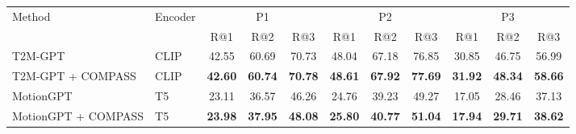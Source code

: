 \begin{tabular*}{\textwidth}{@{\extracolsep{\fill}}ll*{9}{c}@{}}
\toprule
Method & Encoder & \multicolumn{3}{c}{P1} & \multicolumn{3}{c}{P2} & \multicolumn{3}{c}{P3} \\
\cmidrule(lr){3-5}\cmidrule(lr){6-8}\cmidrule(lr){9-11}
& & R@1 & R@2 & R@3 & R@1 & R@2 & R@3 & R@1 & R@2 & R@3 \\
\midrule
T2M-GPT & CLIP & 42.55 & 60.69 & 70.73 & 48.04 & 67.18 & 76.85 & 30.85 & 46.75 & 56.99 \\
T2M-GPT + COMPASS & CLIP & \textbf{42.60} & \textbf{60.74} & \textbf{70.78} & \textbf{48.61} & \textbf{67.92} & \textbf{77.69} & \textbf{31.92} & \textbf{48.34} & \textbf{58.66} \\
\midrule
MotionGPT & T5 & 23.11 & 36.57 & 46.26 & 24.76 & 39.23 & 49.27 & 17.05 & 28.46 & 37.13 \\
MotionGPT + COMPASS & T5 & \textbf{23.98} & \textbf{37.95} & \textbf{48.08} & \textbf{25.80} & \textbf{40.77} & \textbf{51.04} & \textbf{17.94} & \textbf{29.71} & \textbf{38.62} \\
\bottomrule
\end{tabular*}
